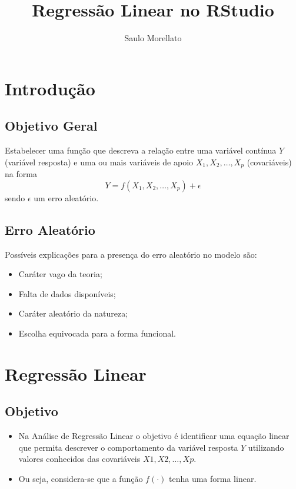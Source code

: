 \documentclass[
  letterpaper,
  DIV=11,
  numbers=noendperiod]{scrartcl}
\title{Regressão Linear no RStudio}
\author{Saulo Morellato}
\date{}
\begin{document}
\maketitle

\section{Introdução}\label{introduuxe7uxe3o}

\subsection{Objetivo Geral}\label{objetivo-geral}

Estabelecer uma função que descreva a relação entre uma variável
contínua \(Y\) (variável resposta) e uma ou mais variáveis de apoio
\(X_1, X_2,\dots, X_p\) (covariáveis) na forma
\[Y=f(X_1,X_2,\ldots,X_p)+\epsilon\] sendo \(\epsilon\) um erro
aleatório.

\subsection{Erro Aleatório}\label{erro-aleatuxf3rio}

Possíveis explicações para a presença do erro aleatório no modelo são:

\begin{itemize}
\item
  Caráter vago da teoria;
\item
  Falta de dados disponíveis;
\item
  Caráter aleatório da natureza;
\item
  Escolha equivocada para a forma funcional.
\end{itemize}

\section{Regressão Linear}\label{regressuxe3o-linear}

\subsection{Objetivo}\label{objetivo}

\begin{itemize}
\item
  Na Análise de Regressão Linear o objetivo é identificar uma equação
  linear que permita descrever o comportamento da variável resposta
  \(Y\) utilizando valores conhecidos das covariáveis
  \(X1,X2,\ldots,Xp\).
\item
  Ou seja, considera-se que a função \(f(\cdot)\) tenha uma forma
  linear.
\end{itemize}
\end{document}
